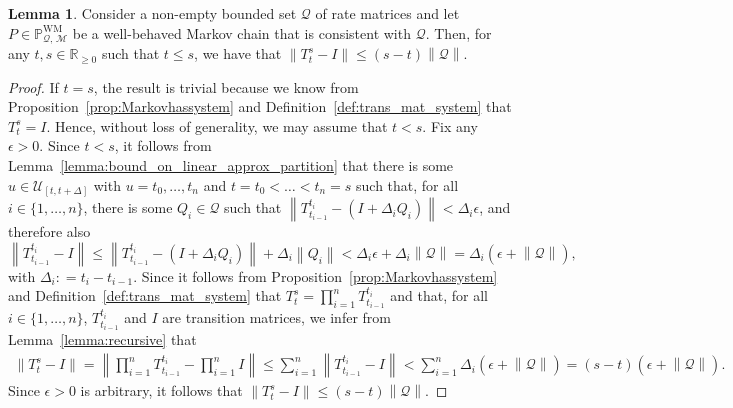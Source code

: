 \documentclass[10pt,a4paper]{paper}
\theoremstyle{definition}
\newtheorem{lemma}[theorem]{Lemma}
\newcommand{\reals}{\mathbb{R}}
\newcommand{\realsnonneg}{\reals_{\geq 0}}
\newcommand{\processes}{\mathbb{P}}
\newcommand{\wmprocesses}{\processes^{\mathrm{WM}}}
\newcommand{\rateset}{\mathcal{Q}}
\newcommand{\norm}[1]{\left\lVert #1 \right\rVert}
\newcommand{\coloneqq}{:\!=}
\begin{document}
\begin{lemma}\label{lemma:uniformelywellbehaved}
Consider a non-empty bounded set $\rateset$ of rate matrices and let $P\in\wmprocesses_{\rateset,\,\mathcal{M}}$ be a well-behaved Markov chain that is consistent with $\rateset$. 
Then, for any $t,s\in\realsnonneg$ such that $t\leq s$, we have that $\norm{T_t^s-I}\leq(s-t)\norm{\rateset}$.
\end{lemma}
\begin{proof}
If $t=s$, the result is trivial because we know from Proposition~\ref{prop:Markovhassystem} and Definition~\ref{def:trans_mat_system} that $T_t^s=I$. Hence, without loss of generality, we may assume that $t<s$. Fix any $\epsilon>0$. Since $t<s$, it follows from Lemma~\ref{lemma:bound_on_linear_approx_partition} that there is some $u\in\mathcal{U}_{[t,t+\Delta]}$ with $u=t_0,\ldots,t_n$ and $t=t_0<\ldots< t_n=s$ such that, for all $i\in\{1,\ldots,n\}$, there is some $Q_i\in\rateset$ such that $\norm{T_{t_{i-1}}^{t_i} - (I+\Delta_iQ_i)} < \Delta_i\epsilon$, and therefore also
\begin{equation*}
\norm{T_{t_{i-1}}^{t_i} - I}
\leq\norm{T_{t_{i-1}}^{t_i} - (I+\Delta_iQ_i)}+\Delta_i\norm{Q_i} < \Delta_i\epsilon+\Delta_i\norm{\rateset}=\Delta_i(\epsilon+\norm{\rateset}),
\end{equation*}
with $\Delta_i\coloneqq t_{i}-t_{i-1}$. Since it follows from Proposition~\ref{prop:Markovhassystem} and Definition~\ref{def:trans_mat_system} that $T_t^s=\prod_{i=1}^n T_{t_{i-1}}^{t_i}$ and that, for all $i\in\{1,\dots,n\}$, $T_{t_{i-1}}^{t_i}$ and $I$ are transition matrices, we infer from Lemma~\ref{lemma:recursive} that
\begin{align*}
\norm{T_t^s-I}
=\norm{\prod_{i=1}^nT_{t_{i-1}}^{t_i}-\prod_{i=1}^n I}
\leq\sum_{i=1}^n\norm{T_{t_{i-1}}^{t_i}-I}
<
\sum_{i=1}^n
\Delta_i(\epsilon+\norm{\rateset})
=(s-t)(\epsilon+\norm{\rateset}).
\end{align*}
Since $\epsilon>0$ is arbitrary, it follows that $\norm{T_t^s-I}\leq(s-t)\norm{\rateset}$.
\end{proof}
\end{document}
